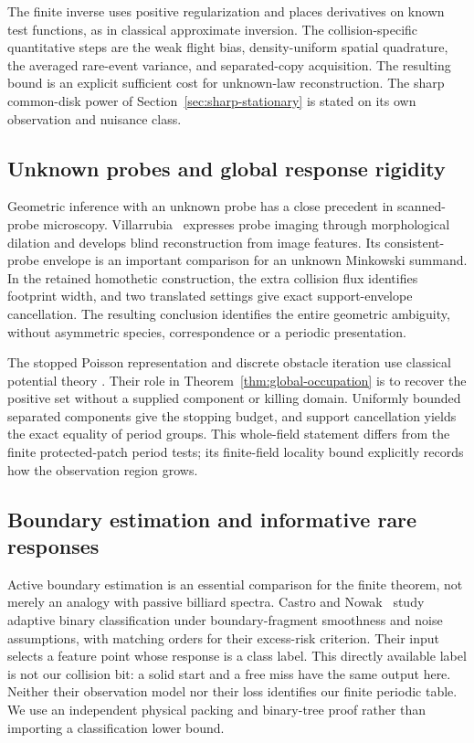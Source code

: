 The finite inverse uses positive regularization and places derivatives
on known test functions, as in classical approximate inversion.
The collision-specific quantitative steps are the weak flight bias,
density-uniform spatial quadrature, the averaged rare-event variance,
and separated-copy acquisition. The resulting bound is an explicit
sufficient cost for unknown-law reconstruction. The sharp common-disk
power of Section~\ref{sec:sharp-stationary} is stated on its own
observation and nuisance class.

\subsection{Unknown probes and global response rigidity}
Geometric inference with an unknown probe has a close precedent in
scanned-probe microscopy. Villarrubia~\cite{Villarrubia} expresses
probe imaging through morphological dilation and develops blind
reconstruction from image features. Its consistent-probe envelope
is an important comparison for an unknown Minkowski summand.
In the retained homothetic construction, the extra collision flux
identifies footprint width, and two translated settings give exact
support-envelope cancellation. The resulting conclusion identifies the entire
geometric ambiguity, without asymmetric species, correspondence or a
periodic presentation.

The stopped Poisson representation and discrete obstacle iteration
use classical potential theory \cite{LawlerLimic}. Their role in
Theorem~\ref{thm:global-occupation} is to recover the positive set
without a supplied component or killing domain. Uniformly bounded
separated components give the stopping budget, and support
cancellation yields the exact equality of period groups. This
whole-field statement differs from the finite protected-patch
period tests; its finite-field locality bound explicitly records
how the observation region grows.

\subsection{Boundary estimation and informative rare responses}
Active boundary estimation is an essential comparison for the finite
theorem, not merely an analogy with passive billiard spectra.
Castro and Nowak~\cite{CN} study adaptive binary classification under
boundary-fragment smoothness and noise assumptions, with matching
orders for their excess-risk criterion. Their input selects a feature
point whose response is a class label. This directly available label
is not our collision bit: a solid start and a free miss have the same
output here. Neither their observation model nor their loss identifies
our finite periodic table. We use an independent physical packing and
binary-tree proof rather than importing a classification lower bound.

